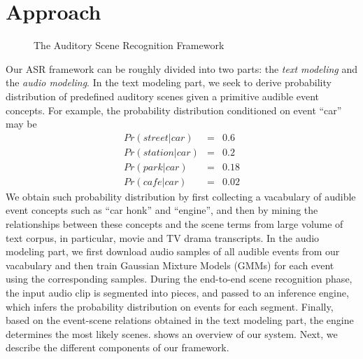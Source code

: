 \section{Approach}
\label{sec:approach}

\begin{figure*}[th]
\centering
{}
\caption{The Auditory Scene Recognition Framework}
\label{fig:sys}
\end{figure*}

Our ASR framework can be roughly divided into two parts: the {\em text 
modeling} and the {\em audio modeling}. In the text modeling part, we seek to
derive probability distribution of predefined auditory scenes given 
a primitive audible event concepts. For example, the probability
distribution conditioned on event ``car'' may be 
\begin{eqnarray*}
Pr(street | car) &=& 0.6\\ 
Pr(station | car) &=& 0.2\\
Pr(park | car) &=& 0.18 \\
Pr(cafe | car) &=& 0.02
\end{eqnarray*}
We obtain such probability distribution by first 
collecting a vacabulary of audible event
concepts such as ``car honk'' and ``engine'', and then by mining the 
relationships between these concepts and the scene terms from large 
volume of text corpus, in particular, movie and TV drama transcripts. 
In the audio modeling part, we first download audio samples of all audible
events from our vacabulary and then train Gaussian Mixture Models (GMMs)
for each event using the corresponding samples. 
During the end-to-end scene recognition phase, the input audio clip 
is segmented into pieces, and passed to an inference engine,
which infers the probability distribution on events for each segment.
Finally, based on the event-scene relations obtained in the text modeling part,
the engine determines the most likely scenes.
 shows an overview of our system. Next, we describe the different
components of our framework. 

%





